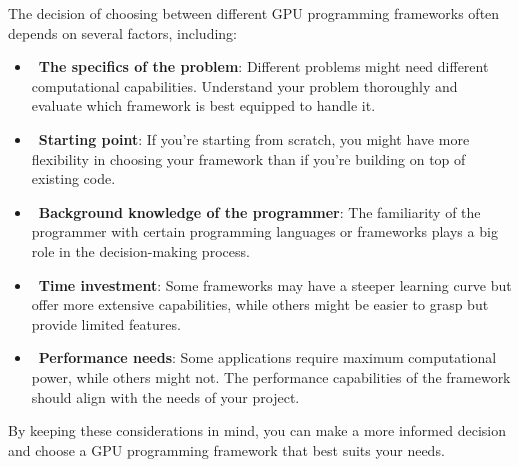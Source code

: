 \par
The decision of choosing between different GPU programming frameworks often depends on several factors, including:
\begin{itemize}
    \item~\textbf{The specifics of the problem}: Different problems might need different computational capabilities. Understand your problem thoroughly and evaluate which framework is best equipped to handle it.
    \item~\textbf{Starting point}: If you’re starting from scratch, you might have more flexibility in choosing your framework than if you’re building on top of existing code.
    \item~\textbf{Background knowledge of the programmer}: The familiarity of the programmer with certain programming languages or frameworks plays a big role in the decision-making process.
    \item~\textbf{Time investment}: Some frameworks may have a steeper learning curve but offer more extensive capabilities, while others might be easier to grasp but provide limited features.
    \item~\textbf{Performance needs}: Some applications require maximum computational power, while others might not. The performance capabilities of the framework should align with the needs of your project.
\end{itemize}


\par
By keeping these considerations in mind, you can make a more informed decision and choose a GPU programming framework that best suits your needs.
